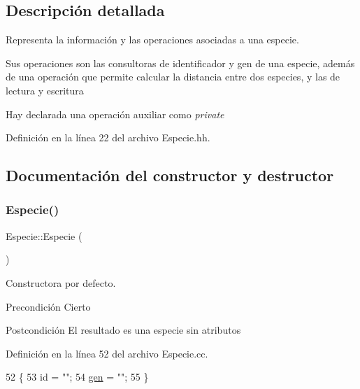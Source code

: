 \subsection{Descripción detallada}
Representa la información y las operaciones asociadas a una especie. 

Sus operaciones son las consultoras de identificador y gen de una especie, además de una operación que permite calcular la distancia entre dos especies, y las de lectura y escritura

Hay declarada una operación auxiliar como {\itshape private} 

Definición en la línea 22 del archivo Especie.\+hh.



\subsection{Documentación del constructor y destructor}
\mbox{\label{class_especie_a272c2488719cc9874b2f174906675b3d}} 
\subsubsection{\texorpdfstring{Especie()}{Especie()}\hspace{0.1cm}{\footnotesize\ttfamily [1/2]}}
{\footnotesize\ttfamily Especie\+::\+Especie (\begin{DoxyParamCaption}{ }\end{DoxyParamCaption})}



Constructora por defecto. 

\begin{DoxyPrecond}{Precondición}
Cierto 
\end{DoxyPrecond}
\begin{DoxyPostcond}{Postcondición}
El resultado es una especie sin atributos 
\end{DoxyPostcond}


Definición en la línea 52 del archivo Especie.\+cc.


\begin{DoxyCode}
52                  \{
53   \textcolor{keywordtype}{id} = \textcolor{stringliteral}{""};
54   \hyperlink{class_especie_ac35bb565f7346cd6317b3a8c849456d1}{gen} = \textcolor{stringliteral}{""};
55 \}
\end{DoxyCode}
\mbox{\label{class_especie_ae7e31049e2120693877ac3e8b2e42043}} 
